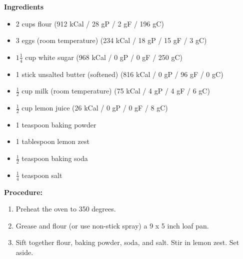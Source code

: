 \begin{multicols}{2}
\textbf{Ingredients} 
\begin{itemize}
\item 2 cups flour \quad (912 kCal / 28 gP / 2 gF / 196 gC)
\item 3 eggs (room temperature)  \newline (234 kCal / 18 gP / 15 gF / 3 gC)
\item $1\frac{1}{4}$ cup white sugar (968 kCal / 0 gP / 0 gF / 250 gC)
\item 1 stick unsalted butter (softened) \newline (816 kCal / 0 gP / 96 gF / 0 gC)
\item $\frac{1}{2}$ cup milk (room temperature) \newline (75 kCal / 4 gP / 4 gF / 6 gC)
\item $\frac{1}{2}$ cup lemon juice \quad (26 kCal / 0 gP / 0 gF / 8 gC)
\item 1 teaspoon baking powder
\item 1 tablespoon lemon zest
\item $\frac{1}{2}$ teaspoon baking soda 
\item $\frac{1}{4}$ teaspoon salt




\end{itemize}


\columnbreak
\textbf{Procedure:}
\medskip


\begin{enumerate}
\item Preheat the oven to 350 degrees. 


\medskip
\item Grease and flour (or use non-stick spray) a 9 x 5 inch loaf pan.
\medskip

\item Sift together flour, baking powder, soda, and salt. Stir in lemon zest. Set aside.



\end{enumerate}
\end{multicols}
